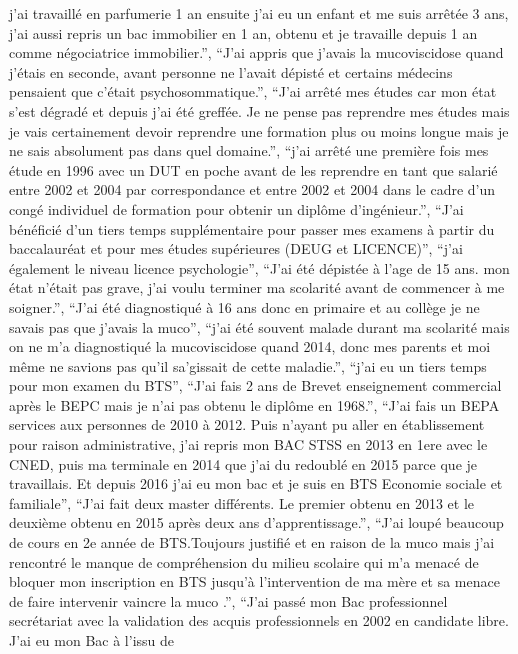 \documentclass[
  letterpaper,
  DIV=11,
  numbers=noendperiod]{scrartcl}
\begin{document}
\begin{itemize}
  j'ai travaillé en parfumerie 1 an ensuite j'ai eu un enfant et me suis
  arrêtée 3 ans, j'ai aussi repris un bac immobilier en 1 an, obtenu et
  je travaille depuis 1 an comme négociatrice immobilier.'', ``J'ai
  appris que j'avais la mucoviscidose quand j'étais en seconde, avant
  personne ne l'avait dépisté et certains médecins pensaient que c'était
  psychosommatique.'', ``J'ai arrêté mes études car mon état s'est
  dégradé et depuis j'ai été greffée. Je ne pense pas reprendre mes
  études mais je vais certainement devoir reprendre une formation plus
  ou moins longue mais je ne sais absolument pas dans quel domaine.'',
  ``j'ai arrêté une première fois mes étude en 1996 avec un DUT en poche
  avant de les reprendre en tant que salarié entre 2002 et 2004 par
  correspondance et entre 2002 et 2004 dans le cadre d'un congé
  individuel de formation pour obtenir un diplôme d'ingénieur.'', ``J'ai
  bénéficié d'un tiers temps supplémentaire pour passer mes examens à
  partir du baccalauréat et pour mes études supérieures (DEUG et
  LICENCE)'', ``j'ai également le niveau licence psychologie'', ``J'ai
  été dépistée à l'age de 15 ans. mon état n'était pas grave, j'ai voulu
  terminer ma scolarité avant de commencer à me soigner.'', ``J'ai été
  diagnostiqué à 16 ans donc en primaire et au collège je ne savais pas
  que j'avais la muco'', ``j'ai été souvent malade durant ma scolarité
  mais on ne m'a diagnostiqué la mucoviscidose quand 2014, donc mes
  parents et moi même ne savions pas qu'il sa'gissait de cette
  maladie.'', ``j'ai eu un tiers temps pour mon examen du BTS'', ``J'ai
  fais 2 ans de Brevet enseignement commercial après le BEPC mais je
  n'ai pas obtenu le diplôme en 1968.'', ``J'ai fais un BEPA services
  aux personnes de 2010 à 2012. Puis n'ayant pu aller en établissement
  pour raison administrative, j'ai repris mon BAC STSS en 2013 en 1ere
  avec le CNED, puis ma terminale en 2014 que j'ai du redoublé en 2015
  parce que je travaillais. Et depuis 2016 j'ai eu mon bac et je suis en
  BTS Economie sociale et familiale'', ``J'ai fait deux master
  différents. Le premier obtenu en 2013 et le deuxième obtenu en 2015
  après deux ans d'apprentissage.'', ``J'ai loupé beaucoup de cours en
  2e année de BTS.Toujours justifié et en raison de la muco mais j'ai
  rencontré le manque de compréhension du milieu scolaire qui m'a menacé
  de bloquer mon inscription en BTS jusqu'à l'intervention de ma mère et
  sa menace de faire intervenir vaincre la muco .'', ``J'ai passé mon
  Bac professionnel secrétariat avec la validation des acquis
  professionnels en 2002 en candidate libre. J'ai eu mon Bac à l'issu de

\end{itemize}
\end{document}
